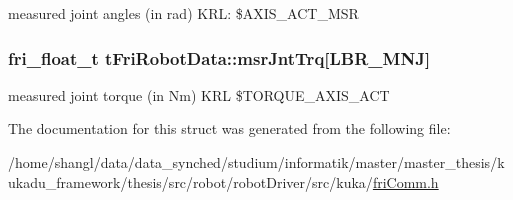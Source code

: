 measured joint angles (in rad) \-K\-R\-L\-: \$\-A\-X\-I\-S\-\_\-\-A\-C\-T\-\_\-\-M\-S\-R \hypertarget{structtFriRobotData_a117d14548142a3a6586146780b188905}{
\subsubsection[{msr\-Jnt\-Trq}]{\setlength{\rightskip}{0pt plus 5cm}fri\-\_\-float\-\_\-t {\bf t\-Fri\-Robot\-Data\-::msr\-Jnt\-Trq}\mbox{[}{\bf \-L\-B\-R\-\_\-\-M\-N\-J}\mbox{]}}}\label{structtFriRobotData_a117d14548142a3a6586146780b188905}
measured joint torque (in \-Nm) \-K\-R\-L \$\-T\-O\-R\-Q\-U\-E\-\_\-\-A\-X\-I\-S\-\_\-\-A\-C\-T 

\-The documentation for this struct was generated from the following file\-:\begin{DoxyCompactItemize}
\item 
/home/shangl/data/data\-\_\-synched/studium/informatik/master/master\-\_\-thesis/kukadu\-\_\-framework/thesis/src/robot/robot\-Driver/src/kuka/\hyperlink{friComm_8h}{fri\-Comm.\-h}\end{DoxyCompactItemize}
